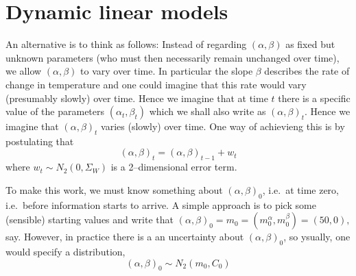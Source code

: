 




\section{Dynamic linear models}
\label{sec:dlm}



An alternative is to think as follows: Instead of regarding
$(\alpha,\beta)$ as fixed but unknown parameters (who must then
necessarily remain unchanged over time), we allow $(\alpha,\beta)$ to
vary over time.  In particular the slope $\beta$
describes the rate of change in temperature and one could imagine that
this rate would vary (presumably slowly) over time. Hence we imagine that at time $t$
there is a specific value of the parameters $(\alpha_t, \beta_t)$
which we shall also write as $(\alpha,\beta)_t$. Hence we imagine that
$(\alpha,\beta)_t$ varies (slowly) over time. One way of achievieng
this is by postulating that 
\begin{equation}
  \label{eq:nht-syseq}
(\alpha,\beta)_t = (\alpha,\beta)_{t-1} + w_t  
\end{equation}
where $w_t \sim N_2(0,\Sigma_W)$ is a 2--dimensional error
term. 

To
make this work, we must know something about
$(\alpha,\beta)_{0}$, i.e.\ at time zero, i.e.\ before information
starts to arrive. A simple approach is to pick some (sensible)
starting values and write that 
$
(\alpha,\beta)_{0}= m_0 = (m_0^\alpha, m_0^\beta)=(50,0),
$ say. 
However, in practice there is a an uncertainty about
$(\alpha,\beta)_{0}$, so ysually, one would specify a distribution,
\begin{equation}
  \label{eq:nht-prior}
  (\alpha,\beta)_{0} \sim N_2(m_0, C_0)  
\end{equation}

